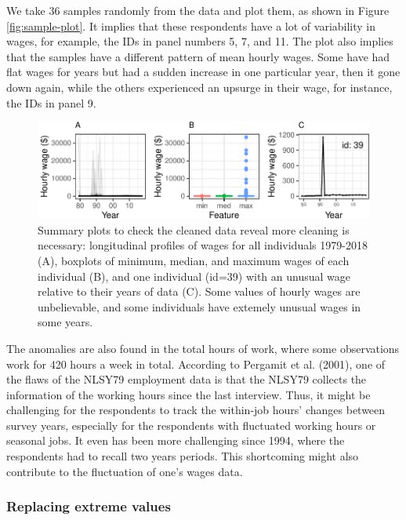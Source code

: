 \documentclass{article}
\begin{document}
We take 36 samples randomly from the data and plot them, as shown in Figure \ref{fig:sample-plot}. It implies that these respondents have a lot of variability in wages, for example, the IDs in panel numbers 5, 7, and 11. The plot also implies that the samples have a different pattern of mean hourly wages. Some have had flat wages for years but had a sudden increase in one particular year, then it gone down again, while the others experienced an upsurge in their wage, for instance, the IDs in panel 9.

\begin{figure}

{\centering \includegraphics[width=432px]{figures/feature-plot-1} 

}

\caption{Summary plots to check the cleaned data reveal more cleaning is necessary: longitudinal profiles of wages for all individuals 1979-2018 (A), boxplots of minimum, median, and maximum wages of each individual (B), and one individual (id=39) with an unusual wage relative to their years of data (C). Some values of hourly wages are unbelievable, and some individuals have extemely unusual wages in some years.}\label{fig:feature-plot}
\end{figure}

The anomalies are also found in the total hours of work, where some observations work for 420 hours a week in total. According to Pergamit et al. (2001), one of the flaws of the NLSY79 employment data is that the NLSY79 collects the information of the working hours since the last interview. Thus, it might be challenging for the respondents to track the within-job hours' changes between survey years, especially for the respondents with fluctuated working hours or seasonal jobs. It even has been more challenging since 1994, where the respondents had to recall two years periods. This shortcoming might also contribute to the fluctuation of one's wages data.

\hypertarget{replacing-extreme-values}{%
\subsubsection{Replacing extreme values}\label{replacing-extreme-values}}
\end{document}
